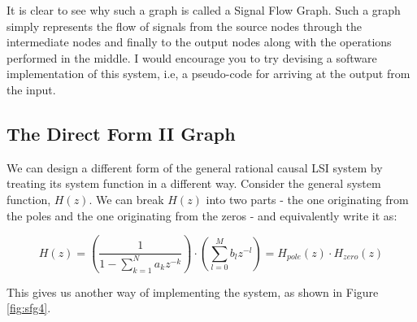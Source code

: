 \documentclass{article}
\theoremstyle{definition}
\newcommand\ddfrac[2]{\frac{\displaystyle #1}{\displaystyle #2}}
\begin{document}
It is clear to see why such a graph is called a Signal Flow Graph. Such a graph simply represents the flow of signals from the source nodes through the intermediate nodes and finally to the output nodes along with the operations performed in the middle. I would encourage you to try devising a software implementation of this system, i.e, a pseudo-code for arriving at the output from the input.

\subsection{The Direct Form II Graph}

We can design a different form of the general rational causal LSI system by treating its system function in a different way. Consider the general system function, $H(z)$. We can break $H(z)$ into two parts - the one originating from the poles and the one originating from the zeros - and equivalently write it as:

\[
    H(z) = \left( \ddfrac{1}{1 - \sum_{k=1}^{N} a_k z^{-k}} \right) \cdot \left( \sum_{l=0}^{M} b_l z^{-l} \right) = H_{pole}(z) \cdot H_{zero}(z)
\]

This gives us another way of implementing the system, as shown in Figure \ref{fig:sfg4}.
\end{document}
